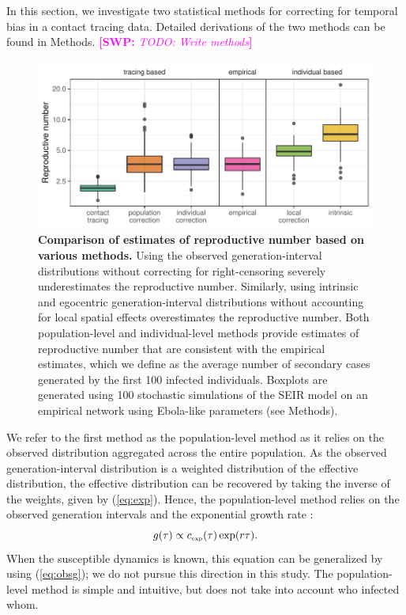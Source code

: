 \documentclass[12pt]{article}
\newcommand{\eref}[1]{(\ref{eq:#1})}
\newcommand{\tsub}[2]{#1_{{\textrm{\tiny #2}}}}
\newcommand{\comment}[3]{\textcolor{#1}{\textbf{[#2: }\textsl{#3}\textbf{]}}}
\newcommand{\swp}[1]{\comment{magenta}{SWP}{#1}}
\begin{document}
In this section, we investigate two statistical methods for correcting for temporal bias in a contact tracing data.
Detailed derivations of the two methods can be found in Methods.
\swp{TODO: Write methods}


\begin{figure}[ht]
\includegraphics[width=\textwidth]{../fig/cmp_reproductive.pdf}
\caption{\textbf{Comparison of estimates of reproductive number based on various methods.}
Using the observed generation-interval distributions without correcting for right-censoring severely underestimates the reproductive number.
Similarly, using intrinsic and egocentric generation-interval distributions without accounting for local spatial effects overestimates the reproductive number.
Both population-level and individual-level methods provide estimates of reproductive number that are consistent with the empirical estimates, which we define as the average number of secondary cases generated by the first 100 infected individuals.
Boxplots are generated using 100 stochastic simulations of the SEIR model on an empirical network using Ebola-like parameters (see Methods).
}
\label{fig:cmp}
\end{figure}

We refer to the first method as the population-level method as it relies on the observed distribution aggregated across the entire population.
As the observed generation-interval distribution is a weighted distribution of the effective distribution, the effective distribution can be recovered by taking the inverse of the weights, given by \eref{exp}.
Hence, the population-level method relies on the observed generation intervals and the exponential growth rate \citep{tomba2010some, nishiura2010time}:
\begin{equation}
g(\tau) \propto \tsub{c}{exp}(\tau) \exp(r\tau).
\end{equation}
When the susceptible dynamics is known, this equation can be generalized by using \eref{obsg}; we do not pursue this direction in this study.
The population-level method is simple and intuitive, but does not take into account who infected whom.
\end{document}

